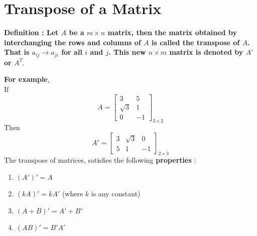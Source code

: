 \documentclass[12pt, letterpaper]{article}
\begin{document}
\section{Transpose of a Matrix}
\begin{displayquote}
\textbf{Definition : Let $A$ be a $m \times n$ matrix, then the matrix obtained by interchanging the rows and columns of $A$ is called the transpose of $A$. That is $a_{ij} \rightarrow a_{ji}$ for all $i$ and $j$. This new $n \times m$ matrix is denoted by $A'$ or $A^T$}.
\end{displayquote}
\textbf{For example}, \\
If 
\begin{displaymath}
A = \begin{bmatrix}
3 & 5\\
\sqrt{3} & 1\\
0 & -1
\end{bmatrix}_{3 \times 2}
\end{displaymath}
Then
\begin{displaymath}
A' = \begin{bmatrix}
3 & \sqrt{3} & 0\\
5 & 1 & -1
\end{bmatrix}_{2 \times 3}
\end{displaymath}
The transpose of matrices, satisfies the following \textbf{properties} :
\begin{enumerate}
    \item $(A')' = A$
    \item $(kA)' = kA'$ (where $k$ is any constant)
    \item $(A + B)' = A' + B'$
    \item $(AB)' = B'A'$
\end{enumerate}
\end{document}
